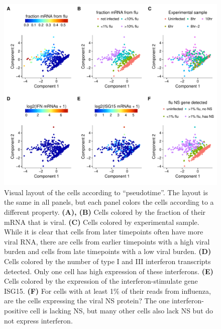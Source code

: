 \documentclass[9pt,lineno]{elife}
\begin{document}
\begin{figure}
\includegraphics[width=\linewidth]{figures/p_pseudo_merge.pdf}
\caption{
Visual layout of the cells according to ``pseudotime''.
The layout is the same in all panels, but each panel colors the cells according to a different property.
{\bf (A), (B)}
Cells colored by the fraction of their mRNA that is viral.
{\bf (C)}
Cells colored by experimental sample.
While it is clear that cells from later timepoints often have more viral RNA, there are cells from earlier timepoints with a high viral burden and cells from late timepoints with a low viral burden.
{\bf (D)}
Cells colored by the number of type I and III interferon transcripts detected.
Only one cell has high expression of these interferons.
{\bf (E)}
Cells colored by the expression of the interferon-stimulate gene ISG15.
{\bf (F)}
For cells with at least 1\% of their reads from influenza, are the cells expressing the viral NS protein?
The one interferon-positive cell is lacking NS, but many other cells also lack NS but do not express interferon.
}
\label{fig:pseudotime}
\end{figure}
\end{document}
